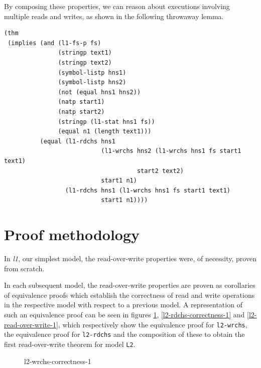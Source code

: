 \documentclass[runningheads,a4paper]{llncs}
\begin{document}
By composing these properties, we can reason about executions
involving multiple reads and writes, as shown in the following
throwaway lemma.

\medskip

\noindent
\begin{verbatim}
(thm
 (implies (and (l1-fs-p fs)
               (stringp text1)
               (stringp text2)
               (symbol-listp hns1)
               (symbol-listp hns2)
               (not (equal hns1 hns2))
               (natp start1)
               (natp start2)
               (stringp (l1-stat hns1 fs))
               (equal n1 (length text1)))
          (equal (l1-rdchs hns1
                           (l1-wrchs hns2 (l1-wrchs hns1 fs start1 text1)
                                     start2 text2)
                           start1 n1)
                 (l1-rdchs hns1 (l1-wrchs hns1 fs start1 text1)
                           start1 n1))))
\end{verbatim}

\section{Proof methodology}

In \textit{l1}, our simplest model, the read-over-write properties
were, of necessity, proven from scratch.

In each subsequent model, the read-over-write properties are proven as
corollaries of equivalence proofs which establish the correctness of
read and write operations in the respective model with respect to a
previous model. A representation of such an equivalence proof can be
seen in figures \ref{l2-wrchs-correctness-1},
\ref{l2-rdchs-correctness-1} and \ref{l2-read-over-write-1}, which
respectively show the equivalence proof for \texttt{l2-wrchs}, the
equivalence proof for \texttt{l2-rdchs} and the composition of these
to obtain the first read-over-write theorem for model \texttt{L2}.


\begin{figure}
  \centering
  \caption{l2-wrchs-correctness-1}
  \label{l2-wrchs-correctness-1}
\end{figure}
\end{document}
